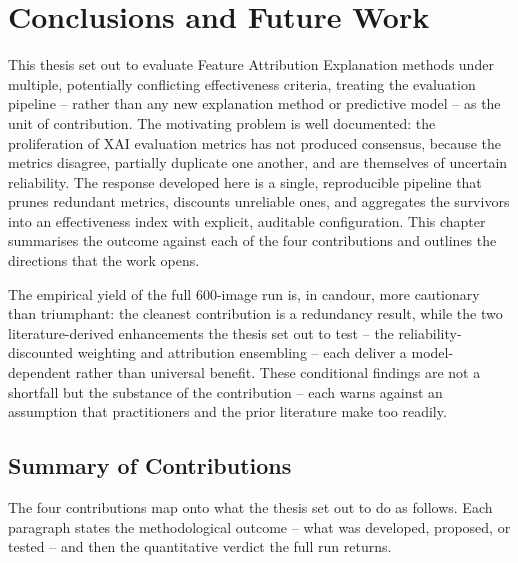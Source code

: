 \chapter{Conclusions and Future Work}
\label{ch:conclusions}

This thesis set out to evaluate Feature Attribution Explanation methods under
multiple, potentially conflicting effectiveness criteria, treating the
evaluation pipeline -- rather than any new explanation method or predictive
model -- as the unit of contribution. The motivating problem is well documented:
the proliferation of XAI evaluation metrics has not produced consensus, because
the metrics disagree, partially duplicate one another, and are themselves of
uncertain reliability. The response developed here is a single, reproducible
pipeline that prunes redundant metrics, discounts unreliable ones, and
aggregates the survivors into an effectiveness index with explicit, auditable
configuration. This chapter summarises the outcome against each of the four
contributions and outlines the directions that the work opens.

The empirical yield of the full 600-image run is, in candour, more cautionary
than triumphant: the cleanest contribution is a redundancy result, while the
two literature-derived enhancements the thesis set out to test -- the
reliability-discounted weighting and attribution ensembling -- each deliver a
model-dependent rather than universal benefit. These conditional findings are
not a
shortfall but the substance of the contribution -- each warns against an
assumption that practitioners and the prior literature make too readily.

\section{Summary of Contributions}
\label{sec:concl-summary}

The four contributions map onto what the thesis set out to do as follows. Each
paragraph states the methodological outcome -- what was developed, proposed, or
tested -- and then the quantitative verdict the full run returns.

